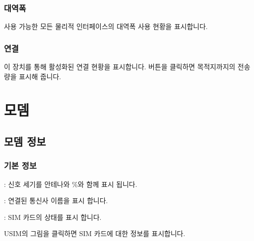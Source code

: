 \documentclass[letterpaper,10pt,english]{sphinxmanual}
\begin{document}
\subsubsection{대역폭}
\label{\detokenize{main_menu/status:id8}}
\noindent{}

\sphinxAtStartPar
사용 가능한 모든 물리적 인터페이스의 대역폭 사용 현황을 표시합니다.


\subsubsection{연결}
\label{\detokenize{main_menu/status:id9}}
\noindent{}

\sphinxAtStartPar
이 장치를 통해 활성화된 연결 현황을 표시합니다.  버튼을 클릭하면 목적지까지의 전송량을 표시해 줍니다.

\sphinxstepscope


\section{모뎀}
\label{\detokenize{main_menu/modem:id1}}\label{\detokenize{main_menu/modem::doc}}

\subsection{모뎀 정보}
\label{\detokenize{main_menu/modem:id2}}

\subsubsection{기본 정보}
\label{\detokenize{main_menu/modem:id3}}
\noindent{}

\sphinxAtStartPar
{} : 신호 세기를 안테나와 \%와 함께 표시 됩니다.

\sphinxAtStartPar
{} : 연결된 통신사 이름을 표시 합니다.

\sphinxAtStartPar
{} : SIM 카드의 상태를 표시 합니다.

\sphinxAtStartPar
USIM의 그림을 클릭하면 SIM 카드에 대한 정보를 표시합니다.

\begin{figure}[htbp]
\centering

\noindent{}
\end{figure}
\end{document}
